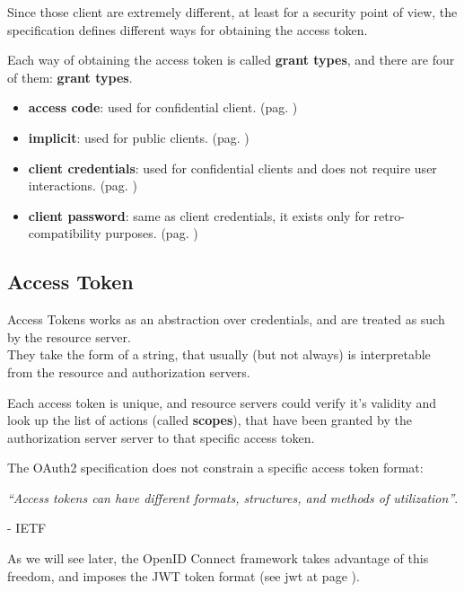 Since those client are extremely different, at least for a security point of
view, the specification defines different ways for obtaining the access token.

Each way of obtaining the access token is called \textbf{grant types}, and
there are four of them:
\textbf{grant types}.
\begin{itemize}
    \item
        \textbf{access code}: used for confidential client. (pag. \pageref{sec:auth-code})
    \item
        \textbf{implicit}: used for public clients. (pag. \pageref{sec:implicit})
    \item
        \textbf{client credentials}: used for confidential clients and does not
        require user interactions. (pag. \pageref{sec:client-credentials})
    \item
        \textbf{client password}: same as client credentials, it exists only
        for retro-compatibility purposes. (pag. \pageref{sec:grant-password})
\end{itemize}

\subsection{Access Token}
Access Tokens works as an abstraction over credentials, and are treated as such
by the resource server.
\\
They take the form of a string, that usually (but not always) is interpretable
from the resource and authorization servers.

Each access token is unique, and resource servers could verify it's validity and
look up the list of actions (called \textbf{scopes}), that have been granted
by the authorization server server to that specific access token.

The OAuth2 specification does not constrain a specific access token format:

\begin{center}
\textit{``Access tokens can have different formats, structures, and methods of
utilization''}.
\end{center}
\begin{flushright}
    - IETF \cite{ietf-oauth}
\end{flushright}

As we will see later, the OpenID Connect framework takes advantage of this
freedom, and imposes the JWT token format (see \ac{jwt} at page \pageref{jwt}).


